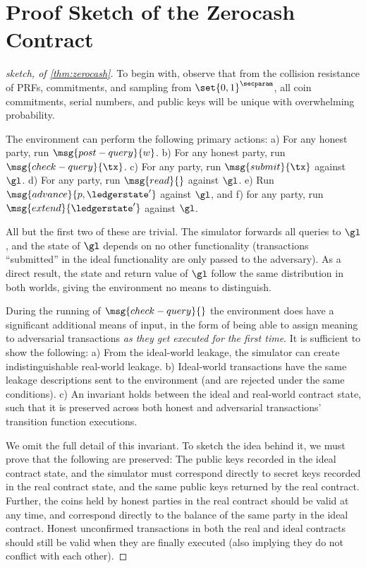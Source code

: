 \section{Proof Sketch of the Zerocash Contract}
\label{app:ppproof}

\begin{proof}[sketch, of \autoref{thm:zerocash}]
  To begin with, observe that from the collision resistance of PRFs,
  commitments, and sampling from $\set{0,1}^\secparam$, all coin commitments,
  serial numbers, and public keys will be unique with overwhelming probability.

  The environment can perform the following primary actions: a) For any honest
  party, run $\msg{post-query}{w}$. b) For any honest party, run
  $\msg{check-query}{\tx}$. c) For any party, run $\msg{submit}{\tx}$ against
  $\gl$. d) For any party, run $\msg{read}{}$ against $\gl$. e) Run
  $\msg{advance}{p, \ledgerstate'}$ against $\gl$, and f) for any party, run
  $\msg{extend}{\ledgerstate'}$ against $\gl$.
  
  All but the first two of these are trivial. The simulator forwards all queries
  to $\gl$, and the state of $\gl$ depends on no other functionality
  (transactions ``submitted'' in the ideal functionality are only passed to the
  adversary). As a direct result, the state and return value of $\gl$ follow the
  same distribution in both worlds, giving the environment no means to
  distinguish.

  During the running of $\msg{check-query}{}$ the environment does have a
  significant additional means of input, in the form of being able to assign
  meaning to adversarial transactions \emph{as they get executed for the first
  time}. It is sufficient to show the following: a) From the ideal-world
  leakage, the simulator can create indistinguishable real-world leakage. b)
  Ideal-world transactions have the same leakage descriptions sent to the
  environment (and are rejected under the same conditions). c) An invariant
  holds between the ideal and real-world contract state, such that it is
  preserved across both honest and adversarial transactions' transition function
  executions.

  We omit the full detail of this invariant. To sketch the idea behind it, we
  must prove that the following are preserved: The public keys recorded in the
  ideal contract state, and the simulator must correspond directly to secret
  keys recorded in the real contract state, and the same public keys returned by
  the real contract. Further, the coins held by honest parties in the real
  contract should be valid at any time, and correspond directly to the balance
  of the same party in the ideal contract. Honest unconfirmed transactions in
  both the real and ideal contracts should still be valid when they are finally
  executed (also implying they do not conflict with each other).


\end{proof}
